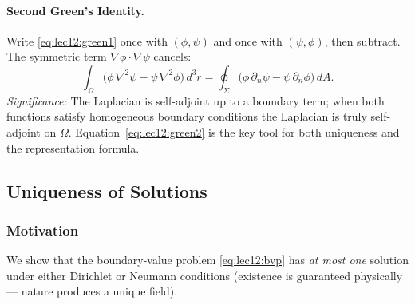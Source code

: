 \paragraph{Second Green's Identity.}
Write \eqref{eq:lec12:green1} once with $(\phi,\psi)$ and once with $(\psi,\phi)$, then
subtract.  The symmetric term $\nabla\phi\cdot\nabla\psi$ cancels:
\begin{equation}\label{eq:lec12:green2}
  \boxed{
    \int_\Omega \!\!\bigl(\phi\,\nabla^2\psi - \psi\,\nabla^2\phi\bigr)\,d^3r
    =
    \oint_\Sigma \!\!\bigl(\phi\,\partial_n\psi - \psi\,\partial_n\phi\bigr)\,dA .
  }
\end{equation}
\textit{Significance:} The Laplacian is self-adjoint up to a boundary term; when both
functions satisfy homogeneous boundary conditions the Laplacian is truly self-adjoint on
$\Omega$.  Equation~\eqref{eq:lec12:green2} is the key tool for both uniqueness and the
representation formula.

\subsection{Uniqueness of Solutions}\label{subsec:lec12-uniqueness}

\subsubsection*{Motivation}
We show that the boundary-value problem \eqref{eq:lec12:bvp} has \emph{at most one}
solution under either Dirichlet or Neumann conditions (existence is guaranteed physically —
nature produces a unique field).

